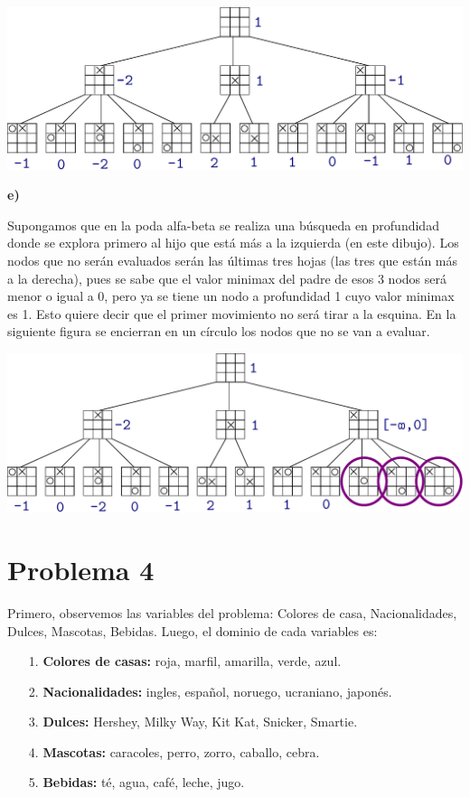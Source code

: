 \documentclass{article}
\begin{document}
\includegraphics[scale=0.6]{gatos3}

\textbf{e)}

Supongamos que en la poda alfa-beta se realiza una búsqueda en profundidad donde se explora primero al hijo que está más a la izquierda (en este dibujo). Los nodos que no serán evaluados serán las últimas tres hojas (las tres que están más a la derecha), pues se sabe que el valor minimax del padre de esos 3 nodos será menor o igual a 0, pero ya se tiene un nodo a profundidad 1 cuyo valor minimax es 1. Esto quiere decir que el primer movimiento no será tirar a la esquina. En la siguiente figura se encierran en un círculo los nodos que no se van a evaluar.

\includegraphics[scale=0.6]{gatos4}

\section*{Problema 4}

Primero, observemos las variables del problema: Colores de casa, Nacionalidades, Dulces, Mascotas, Bebidas. Luego, el dominio de cada variables es:

\begin{itemize}
\item[1.] \textbf{Colores de casas:} roja, marfil, amarilla, verde, azul.
\item[2.] \textbf{Nacionalidades:} ingles, español, noruego, ucraniano, japonés.
\item[3.] \textbf{Dulces:} Hershey, Milky Way, Kit Kat, Snicker, Smartie.
\item[4.] \textbf{Mascotas:} caracoles, perro, zorro, caballo, cebra.
\item[5.] \textbf{Bebidas:} té, agua, café, leche, jugo.
\end{itemize}
\end{document}
